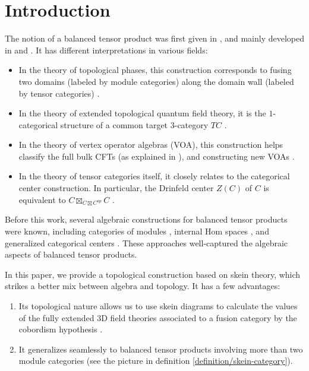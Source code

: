 \section{Introduction}


The notion of a balanced tensor product was first given in
\cite{etingof/fusion-cat-and-homotopy}, and mainly developed in
\cite{douglas/balanced-product} and \cite{douglas/dualizable-tensor-categories}. It has different interpretations in various
fields:
\begin{itemize}
  \item In the theory of topological phases, this construction corresponds to
        fusing two domains (labeled by module categories) along the domain
        wall (labeled by tensor categories) \cite{kong/topological-order}.
  \item In the theory of extended topological quantum field theory, it is the
        $1$-categorical structure of a common target $3$-category $TC$
        \cite{douglas/dualizable-tensor-categories}.
  \item In the theory of vertex operator algebras (VOA), this construction helps
        classify the full bulk CFTs (as explained in
        \cite{gannon/exotic-quantum-subgroup}), and constructing new VOAs
        \cite{gannon/sln-II}.
  \item In the theory of tensor categories itself, it closely relates to the
        categorical center construction. In particular, the Drinfeld center
        $Z(C)$ of $C$ is equivalent to $C \boxtimes_{C \boxtimes C^{op}} C$
        \cite{kirillov/string-net-tv}
        \cite{douglas/dualizable-tensor-categories}.
\end{itemize}

Before this work, several algebraic constructions for balanced tensor products
were known, including categories of modules \cite{douglas/balanced-product},
internal Hom spaces \cite{davydov/picard}, and generalized categorical centers
\cite{etingof/fusion-cat-and-homotopy} \cite{kirillov/fact-homo-4d-tqft}
\cite{hoek/master}. These approaches well-captured the algebraic aspects of
balanced tensor products.

In this paper, we provide a topological construction based on skein theory,
which strikes a better mix between algebra and topology. It has a few advantages:

\begin{enumerate}
  \item Its topological nature allows us to use skein diagrams to calculate the
        values of the fully extended $3$D field theories associated to a
        fusion category by the cobordism hypothesis \cite{lurie/tqft}
        \cite{douglas/dualizable-tensor-categories}
        \cite{guu/tv-as-3-functor}.
  \item It generalizes seamlessly to balanced tensor products involving more than
        two module categories (see the picture in definition
        \ref{definition/skein-category}).
      \end{enumerate}

